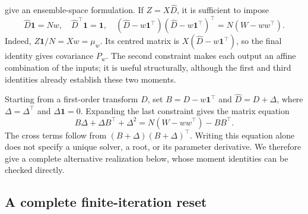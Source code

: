 \documentclass[11pt,a4paper]{article}
\newcommand{\one}{\mathbf 1}
\begin{document}
\citet[Definition 3.1 and Sections 4--6]{acevedo2017} give an ensemble-space
formulation. If \(Z=X\widehat D\), it is sufficient to impose
\begin{equation}
\label{eq:transform-constraints}
 \widehat D\one=Nw,\quad
 \widehat D^\top\one=\one,\quad
 (\widehat D-w\one^\top)(\widehat D-w\one^\top)^\top
       =N(W-ww^\top).
\end{equation}
Indeed, \(Z\one/N=Xw=\mu_w\). Its centred matrix is
\(X(\widehat D-w\one^\top)\), so the final identity gives covariance \(P_w\).
The second constraint makes each output an affine combination of the inputs;
it is useful structurally, although the first and third identities already
establish these two moments.

Starting from a first-order transform \(D\), set \(B=D-w\one^\top\) and
\(\widehat D=D+\Delta\), where \(\Delta=\Delta^\top\) and
\(\Delta\one=0\). Expanding the last constraint gives the matrix equation
\begin{equation}
\label{eq:riccati-correction}
 B\Delta+\Delta B^\top+\Delta^2
   =N(W-ww^\top)-BB^\top.
\end{equation}
The cross terms follow from \((B+\Delta)(B+\Delta)^\top\).
Writing this equation alone does not specify a unique solver, a root,
or its parameter derivative. We therefore give a complete alternative
realization below, whose moment identities can be checked directly.

\subsection{A complete finite-iteration reset}
\end{document}
